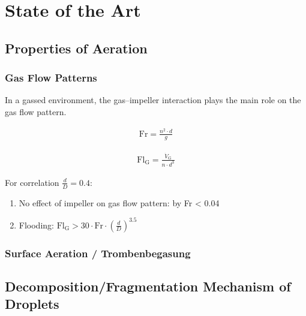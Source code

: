 \chapter{State of the Art} \label{ch:state_of_the_art}





\section{Properties of Aeration}

\subsection{Gas Flow Patterns}
In a gassed environment, the gas--impeller interaction plays the main role on the gas flow pattern.

\begin{gather}
    \text{Fr} = \frac{n^2 \cdot d}{g}
\end{gather}

\begin{gather}
    \text{Fl}_\text{G} = \frac{\Dot{V}_\text{G}}{n \cdot d^3}
\end{gather}

For correlation $\frac{d}{D} = 0.4$:

\begin{enumerate}
    \item No effect of impeller on gas flow pattern: by Fr < 0.04
    \item Flooding: $\text{Fl}_\text{G} > 30 \cdot \text{Fr} \cdot \left( \frac{d}{D} \right)^{3.5}$
\end{enumerate}

\subsection{Surface Aeration / Trombenbegasung}

\section{Decomposition/Fragmentation Mechanism of Droplets}
